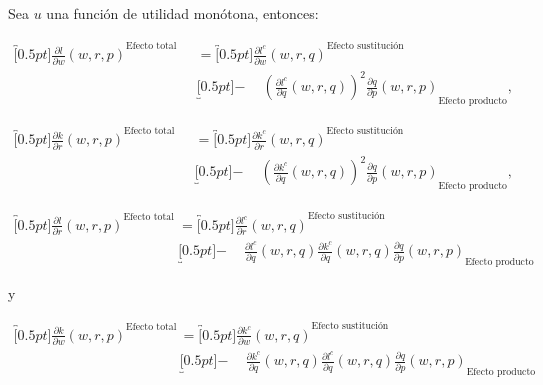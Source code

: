 \documentclass[8pt,a4paper]{extarticle}
\begin{document}
\begin{multicols}{3}
\newpage

\sectionbreak

\begin{boxtheo}
	Sea $u$ una función de utilidad monótona, entonces:
	
	\begin{equation*}
	\begin{aligned}
		\overbracket[0.5pt]{\frac{\partial l}{\partial w} (w, r, p)}^{\text{Efecto total}} \quad &= \overbracket[0.5pt]{\frac{\partial l^c}{\partial w} (w, r, q)}^{\text{Efecto sustitución}} \\
																						& \underbracket[0.5pt]{ - \quad\ \left( \frac{\partial l^c}{\partial q} (w,r,q) \right)^2 \frac{\partial q}{\partial p} (w, r, p)}_{\text{Efecto producto}},
	\end{aligned}
	\end{equation*}	

	\begin{equation*}
	\begin{aligned}
		\overbracket[0.5pt]{\frac{\partial k}{\partial r} (w, r, p)}^{\text{Efecto total}} \quad &= \overbracket[0.5pt]{\frac{\partial k^c}{\partial r} (w, r, q)}^{\text{Efecto sustitución}} \\
																						& \underbracket[0.5pt]{ - \quad\ \left( \frac{\partial k^c}{\partial q} (w,r,q) \right)^2 \frac{\partial q}{\partial p} (w, r, p)}_{\text{Efecto producto}},
	\end{aligned}
	\end{equation*}	
	
	\begin{equation*}
	\begin{aligned}
		\overbracket[0.5pt]{\frac{\partial l}{\partial r} (w, r, p)}^{\text{Efecto total}} \quad &= \overbracket[0.5pt]{\frac{\partial l^c}{\partial r} (w, r, q)}^{\text{Efecto sustitución}} \\
																						& \underbracket[0.5pt]{ - \quad\ \frac{\partial l^c}{\partial q} (w ,r, q) \frac{\partial k^c}{\partial q} (w, r, q) \frac{\partial q}{\partial p} (w, r, p)}_{\text{Efecto producto}}
	\end{aligned}
	\end{equation*}
	
	y

	\begin{equation*}
	\begin{aligned}
		\overbracket[0.5pt]{\frac{\partial k}{\partial w} (w, r, p)}^{\text{Efecto total}} \quad &= \overbracket[0.5pt]{\frac{\partial k^c}{\partial w} (w, r, q)}^{\text{Efecto sustitución}} \\
																						& \underbracket[0.5pt]{ - \quad\ \frac{\partial k^c}{\partial q} (w ,r, q) \frac{\partial l^c}{\partial q} (w, r, q) \frac{\partial q}{\partial p} (w, r, p)}_{\text{Efecto producto}}
	\end{aligned}
	\end{equation*}
	
\end{boxtheo}

\vfill\eject
\columnbreak
\end{multicols}
\end{document}
